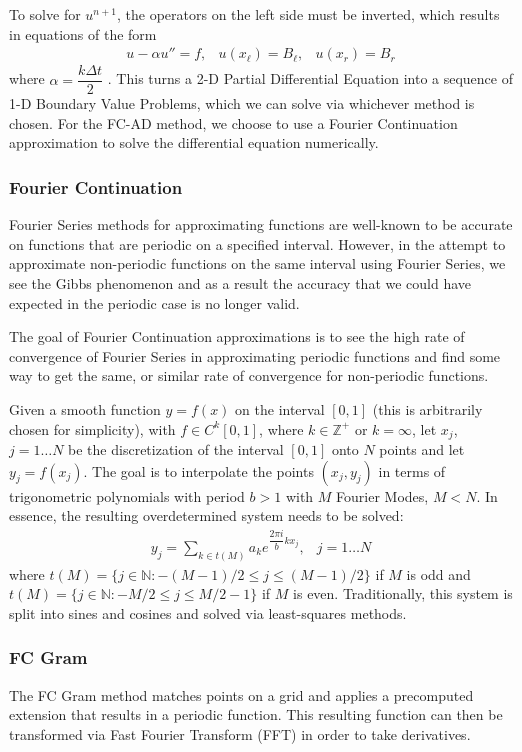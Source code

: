 \documentclass[11pt]{amsart}
\begin{document}
To solve for $u^{n+1}$, the operators on the left side must be inverted, which results in equations of the form 
\begin{eqnarray}
u-\alpha u'' = f, & u(x_{\ell})=B_{\ell}, & u(x_r)=B_r 
\end{eqnarray}
where $\alpha=\dfrac{k\Delta t}{2}$ \cite{FCAD1}.  This turns a 2-D Partial Differential Equation into a sequence of 1-D Boundary Value Problems, which we can solve via whichever method is chosen.  For the FC-AD method, we choose to use a Fourier Continuation approximation to solve the differential equation numerically.  

\subsubsection{Fourier Continuation}
Fourier Series methods for approximating functions are well-known to be accurate on functions that are periodic on a specified interval.  However, in the attempt to approximate non-periodic functions on the same interval using Fourier Series, we see the Gibbs phenomenon and as a result the accuracy that we could have expected in the periodic case is no longer valid.  

The goal of Fourier Continuation approximations is to see the high rate of convergence of Fourier Series in approximating periodic functions and find some way to get the same, or similar rate of convergence for non-periodic functions.  

Given a smooth function $y=f(x)$ on the interval $[0,1]$ (this is arbitrarily chosen for simplicity), with $f\in C^k[0,1]$, where $k \in \mathbb{Z}^{+}$ or $k=\infty$, let $x_j$, $j=1 \ldots N$ be the discretization of the interval $[0,1]$ onto $N$ points and let $y_j  = f(x_j)$.  
The goal is to interpolate the points $(x_j,y_j)$ in terms of trigonometric polynomials with period $b>1$ with $M$ Fourier Modes, $M<N$.  
In essence, the resulting overdetermined system needs to be solved:
\begin{eqnarray}
y_j=\sum_{k\in t(M)} a_k e^{\dfrac{2\pi i}{b}kx_j}, &j=1\ldots N
\end{eqnarray}
where $t(M)=\{j\in \mathbb{N}: -(M-1)/2 \leq j \leq (M-1)/2\}$ if $M$ is odd and $t(M)=\{j\in \mathbb{N}: -M/2\leq j \leq M/2-1\}$ if $M$ is even. 
Traditionally, this system is split into sines and cosines and solved via least-squares methods\cite{FC1}.  




\subsubsection{FC Gram}
The FC Gram method matches points on a grid and applies a precomputed extension that results in a periodic function.  This resulting function can then be transformed via Fast Fourier Transform (FFT) in order to take derivatives. 
\end{document}
